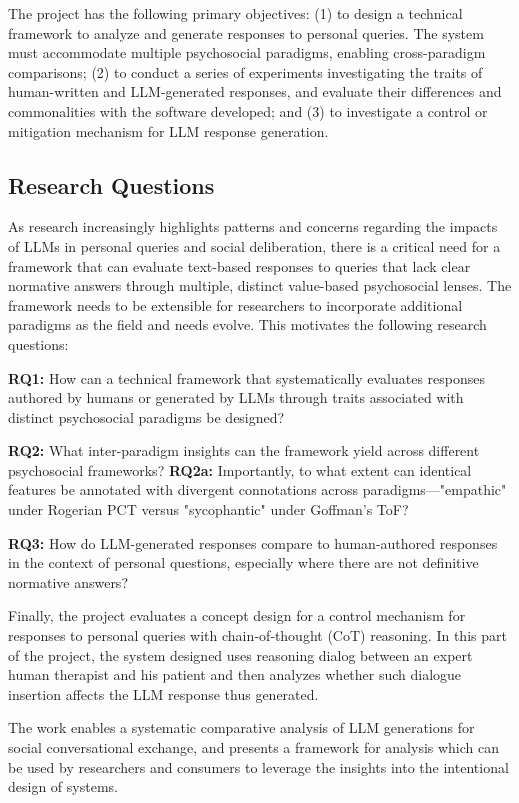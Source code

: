 The project has the following primary objectives: (1) to design a technical framework to analyze and generate responses to personal queries. The system must accommodate multiple psychosocial paradigms, enabling cross-paradigm comparisons; (2) to conduct a series of experiments investigating the traits of human-written and LLM-generated responses, and evaluate their differences and commonalities with the software developed; and (3) to investigate a control or mitigation mechanism for LLM response generation.

\subsection{Research Questions}\label{sec:RQs}
As research increasingly highlights patterns and concerns \cite{Fangchatbot} regarding the impacts of LLMs in personal queries and social deliberation, there is a critical need for a framework that can evaluate text-based responses to queries that lack clear normative answers through multiple, distinct value-based psychosocial lenses. The framework needs to be extensible for researchers to incorporate additional paradigms as the field and needs evolve. This motivates the following research questions: 

\medskip\textbf{RQ1:} How can a technical framework that systematically evaluates responses authored by humans or generated by LLMs through traits associated with distinct psychosocial paradigms be designed?  

\medskip\textbf{RQ2:} What inter-paradigm insights can the framework yield across different psychosocial frameworks?
\textbf{RQ2a:} Importantly, to what extent can identical features be annotated with divergent connotations across paradigms—"empathic" under Rogerian PCT versus "sycophantic" under Goffman’s ToF?

\medskip\textbf{RQ3:} How do LLM-generated responses compare to human-authored responses in the context of personal questions, especially where there are not definitive normative answers?

Finally, the project evaluates a concept design for a control mechanism for responses to personal queries with chain‑of‑thought (CoT) reasoning. In this part of the project, the system designed uses reasoning dialog between an expert human therapist and his patient and then analyzes whether such dialogue insertion affects the LLM response thus generated.

The work enables a systematic comparative analysis of LLM generations for social conversational exchange, and presents a framework for analysis which can be used by researchers and consumers to leverage the insights into the intentional design of systems.

